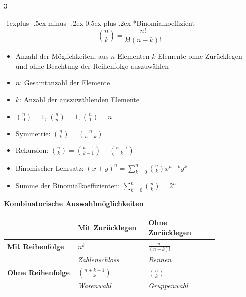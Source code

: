 \documentclass[10pt,a4paper,landscape]{article}
\makeatletter
\renewcommand{\subsection}{\@startsection{subsection}{2}{0mm}%
                                {-1explus -.5ex minus -.2ex}%
                                {0.5ex plus .2ex}%
                                {\normalfont\normalsize\bfseries}}
\makeatother
\begin{document}
\begin{multicols*}{3}
{		 \subsection*{Binomialkoeffizient}
			 \begin{equation*}
				 \binom{n}{k} = \frac{n!}{k!(n-k)!}
			 \end{equation*}
			 \begin{itemize}
				 \item Anzahl der Möglichkeiten, aus $n$ Elementen $k$ Elemente ohne Zurücklegen und ohne Beachtung der Reihenfolge auszuwählen
				 \item $n$: Gesamtanzahl der Elemente
				 \item $k$: Anzahl der auszuwählenden Elemente
				 \item $\binom{n}{0} = 1$, $\binom{n}{n} = 1$, $\binom{n}{1} = n$
				 \item Symmetrie: $\binom{n}{k} = \binom{n}{n-k}$
				 \item Rekursion: $\binom{n}{k} = \binom{n-1}{k-1} + \binom{n-1}{k}$
				 \item Binomischer Lehrsatz: $(x + y)^n = \sum_{k=0}^{n} \binom{n}{k} x^{n-k} y^k$
				 \item Summe der Binomialkoeffizienten: $\sum_{k=0}^{n} \binom{n}{k} = 2^n$
			 \end{itemize}

			 \begin{center}
				 \textbf{Kombinatorische Auswahlmöglichkeiten}
			 \end{center}

			 \setlength{\tabcolsep}{9pt}
			 \renewcommand{\arraystretch}{1.3}
			 \begin{tabular}{|>{\centering\arraybackslash}m{0.28\linewidth}
				 |>{\centering\arraybackslash}m{0.28\linewidth}
				 |>{\centering\arraybackslash}m{0.28\linewidth}|}
				 \hline
				                           & \textbf{Mit Zurücklegen} & \textbf{Ohne Zurücklegen} \\ \hline
				 \textbf{Mit Reihenfolge}  & $n^k$                    & $\frac{n!}{(n-k)!}$       \\
				                           & \textit{Zahlenschloss}   & \textit{Rennen}           \\ \hline

				 \textbf{Ohne Reihenfolge} & $\binom{n+k-1}{k}$       & $\binom{n}{k}$            \\
				                           & \textit{Warenwahl}       & \textit{Gruppenwahl}      \\ \hline
			 \end{tabular}

}
\end{multicols*}
\end{document}
